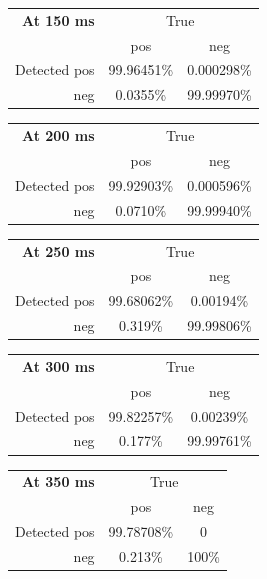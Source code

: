 \documentclass[10pt,letterpaper]{article}
\begin{document}
\vspace{8pt}\par\noindent
\begin{tabular}{r|cc}
  {\bf At 150 ms} & \multicolumn{2}{c}{True} \\ 
  & pos & neg \\ 
  \hline  Detected pos & 99.96451\% & 0.000298\%\\ 
  neg & 0.0355\% & 99.99970\%\\ 
\end{tabular}
\vspace{8pt}\par\noindent
\begin{tabular}{r|cc}
  {\bf At 200 ms} & \multicolumn{2}{c}{True} \\ 
  & pos & neg \\ 
  \hline  Detected pos & 99.92903\% & 0.000596\%\\ 
  neg & 0.0710\% & 99.99940\%\\ 
\end{tabular}
\vspace{8pt}\par\noindent
\begin{tabular}{r|cc}
  {\bf At 250 ms} & \multicolumn{2}{c}{True} \\ 
  & pos & neg \\ 
  \hline  Detected pos & 99.68062\% & 0.00194\%\\ 
  neg & 0.319\% & 99.99806\%\\ 
\end{tabular}
\vspace{8pt}\par\noindent
\begin{tabular}{r|cc}
  {\bf At 300 ms} & \multicolumn{2}{c}{True} \\ 
  & pos & neg \\ 
  \hline  Detected pos & 99.82257\% & 0.00239\%\\ 
  neg & 0.177\% & 99.99761\%\\ 
\end{tabular}
\vspace{8pt}\par\noindent
\begin{tabular}{r|cc}
  {\bf At 350 ms} & \multicolumn{2}{c}{True} \\ 
  & pos & neg \\ 
  \hline  Detected pos & 99.78708\% & 0\\ 
  neg & 0.213\% & 100\%\\ 
\end{tabular}
\end{document}
